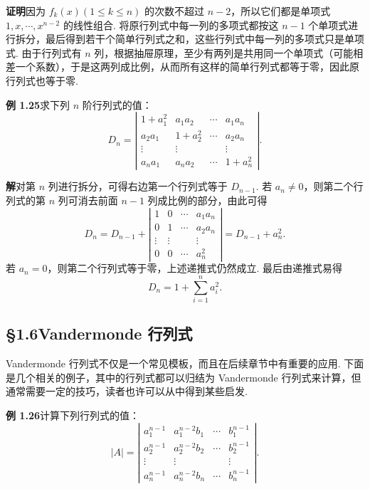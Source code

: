 \documentclass[UTF8, 12pt, fontset=fandol, oneside]{ctexart}
\begin{document}
\noindent\textbf{证明}\quad 因为 $f_k(x)(1\le k\le n)$ 的次数不超过 $n-2$，所以它们都是单项式 $1,x,\cdots,x^{n-2}$ 的线性组合. 将原行列式中每一列的多项式都按这 $n-1$ 个单项式进行拆分，最后得到若干个简单行列式之和，这些行列式中每一列的多项式只是单项式. 由于行列式有 $n$ 列，根据抽屉原理，至少有两列是共用同一个单项式（可能相差一个系数），于是这两列成比例，从而所有这样的简单行列式都等于零，因此原行列式也等于零.

\noindent\textbf{例 1.25}\quad 求下列 $n$ 阶行列式的值：
\[
D_n=\left|\begin{array}{cccc}
1+a_1^2 & a_1a_2 & \cdots & a_1a_n\\
a_2a_1 & 1+a_2^2 & \cdots & a_2a_n\\
\vdots & \vdots &        & \vdots\\
a_na_1 & a_na_2 & \cdots & 1+a_n^2
\end{array}\right|.
\]

\noindent\textbf{解}\quad 对第 $n$ 列进行拆分，可得右边第一个行列式等于 $D_{n-1}$. 若 $a_n\ne0$，则第二个行列式的第 $n$ 列可消去前面 $n-1$ 列成比例的部分，由此可得
\[
D_n=D_{n-1}+
\left|\begin{array}{cccc}
1 & 0 & \cdots & a_1a_n\\
0 & 1 & \cdots & a_2a_n\\
\vdots & \vdots &        & \vdots\\
0 & 0 & \cdots & a_n^2
\end{array}\right|
=D_{n-1}+a_n^2.
\]
若 $a_n=0$，则第二个行列式等于零，上述递推式仍然成立. 最后由递推式易得
\[
D_n=1+\sum_{i=1}^n a_i^2.
\]

\subsection*{§1.6\quad Vandermonde 行列式}

Vandermonde 行列式不仅是一个常见模板，而且在后续章节中有重要的应用. 下面是几个相关的例子，其中的行列式都可以归结为 Vandermonde 行列式来计算，但通常需要一定的技巧，读者也许可以从中得到某些启发.

\noindent\textbf{例 1.26}\quad 计算下列行列式的值：
\[
|A|=\left|\begin{array}{cccc}
a_1^{n-1} & a_1^{n-2}b_1 & \cdots & b_1^{n-1}\\
a_2^{n-1} & a_2^{n-2}b_2 & \cdots & b_2^{n-1}\\
\vdots & \vdots &        & \vdots\\
a_n^{n-1} & a_n^{n-2}b_n & \cdots & b_n^{n-1}
\end{array}\right|.
\]
\end{document}
